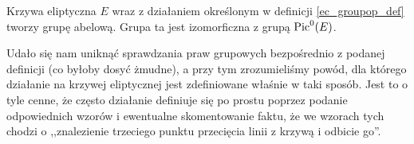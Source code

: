 \begin{corollary}
Krzywa eliptyczna $E$ wraz z działaniem określonym w definicji
\ref{ec_groupop_def} tworzy grupę abelową.
Grupa ta jest izomorficzna z grupą $\operatorname{Pic}^0(E)$.
\end{corollary}

Udało się nam uniknąć sprawdzania praw grupowych
bezpośrednio z podanej definicji (co byłoby dosyć żmudne),
a przy tym zrozumieliśmy powód,
dla którego działanie na krzywej eliptycznej jest zdefiniowane
właśnie w taki sposób.
Jest to o tyle cenne, że często działanie
definiuje się po prostu poprzez podanie odpowiednich wzorów
i ewentualne skomentowanie faktu,
że we wzorach tych chodzi o ,,znalezienie trzeciego punktu
przecięcia linii z krzywą i odbicie go''.
